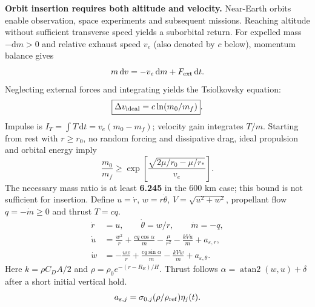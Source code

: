 \documentclass[10pt]{article}
\begin{document}
\fontsize{10.3}{12.7}\selectfont
{}
\columnstart
{}
\textbf{Orbit insertion requires both altitude and velocity.} Near-Earth orbits enable observation, space experiments and subsequent missions. Reaching altitude without sufficient transverse speed yields a suborbital return.
For expelled mass $-\mathrm dm>0$ and relative exhaust speed $v_e$ (also denoted by $c$ below), momentum balance gives
\[
 m\,\mathrm dv=-v_e\,\mathrm dm+F_{\rm ext}\,\mathrm dt.
\]
Neglecting external forces and integrating yields the Tsiolkovsky equation:
\[
 \boxed{\Delta v_{\rm ideal}=c\ln(m_0/m_f)}.
\]
Impulse is $I_T=\int T\,\mathrm dt=v_e(m_0-m_f)$; velocity gain integrates $T/m$. Starting from rest with $r\ge r_0$, no random forcing and dissipative drag, ideal propulsion and orbital energy imply
\[
 \frac{m_0}{m_f}\ge\exp\!\left[\frac{\sqrt{2\mu/r_0-\mu/r_*}}{v_e}\right].
\]
The necessary mass ratio is at least \textbf{6.245} in the 600 km case; this bound is not sufficient for insertion.
Define $u=\dot r$, $w=r\dot\theta$, $V=\sqrt{u^2+w^2}$, propellant flow $q=-\dot m\ge0$ and thrust $T=cq$.
\[
\begin{aligned}
 \dot r&=u,\qquad \dot\theta=w/r,\qquad \dot m=-q,\\
 \dot u&=\frac{w^2}{r}+\frac{cq\cos\alpha}{m}-\frac{\mu}{r^2}
 -\frac{kVu}{m}+a_{\varepsilon,r},\\
 \dot w&=-\frac{uw}{r}+\frac{cq\sin\alpha}{m}
 -\frac{kVw}{m}+a_{\varepsilon,\theta}.
\end{aligned}
\]
Here $k=\rho C_DA/2$ and $\rho=\rho_0e^{-(r-R_E)/H}$. Thrust follows $\alpha=\operatorname{atan2}(w,u)+\delta$ after a short initial vertical hold.
\[
 a_{\varepsilon,j}=\sigma_{0,j}(\rho/\rho_{\rm ref})\eta_j(t).
\]
\end{document}
